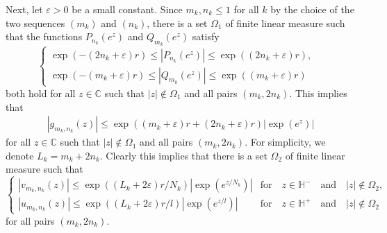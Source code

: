 \documentclass[12pt]{amsart}
\numberwithin{equation}{section}
\begin{document}
Next, let $\varepsilon>0$ be a small constant. Since $m_k,n_k\leq 1$ for all $k$ by the choice of the two sequences $(m_k)$ and $(n_k)$, there is a set $\Omega_1$ of finite linear measure such that the functions $P_{n_k}(e^{z})$ and $Q_{m_k}(e^z)$ satisfy
\begin{equation}\label{growth-1}
\left\{
\begin{array}{ll}
\exp(-(2n_k+\varepsilon)r)\leq\left|P_{n_k}(e^{z})\right|\leq \exp((2n_k+\varepsilon)r), &\\
\exp(-(m_k+\varepsilon)r)\leq\left|Q_{m_k}(e^{z})\right|\leq \exp((m_k+\varepsilon)r) &
\end{array}
\right.
\end{equation}
both hold for all $z\in \mathbb{C}$ such that $|z|\not\in \Omega_1$ and all pairs $(m_k,2n_k)$. This implies that
\begin{equation}\label{growth-2}
\begin{split}
|g_{m_k,n_k}(z)|\leq \exp((m_k+\varepsilon)r+(2n_k+\varepsilon)r)\left|\exp(e^z)\right|
\end{split}
\end{equation}
for all $z\in \mathbb{C}$ such that $|z|\not\in \Omega_1$ and all pairs $(m_k,2n_k)$. For simplicity, we denote $L_k=m_k+2n_k$. Clearly this implies that there is a set $\Omega_2$ of finite linear measure such that
\begin{equation}\label{growth-3}
\left\{
\begin{array}{ll}
|v_{m_k,n_k}(z)|\leq \exp((L_k+2\varepsilon)r/N_k)\left|\exp(e^{z/N_k})\right| & \text{for} \quad z\in \mathbb{H}^{-} \quad \text{and} \quad |z|\not\in \Omega_2,\\
|u_{m_k,n_k}(z)|\leq \exp((L_k+2\varepsilon)r/l)\left|\exp(e^{z/l})\right| & \text{for} \quad z\in \mathbb{H}^{+} \quad \text{and} \quad |z|\not\in \Omega_2
\end{array}
\right.
\end{equation}
for all pairs $(m_k,2n_k)$.
\end{document}
